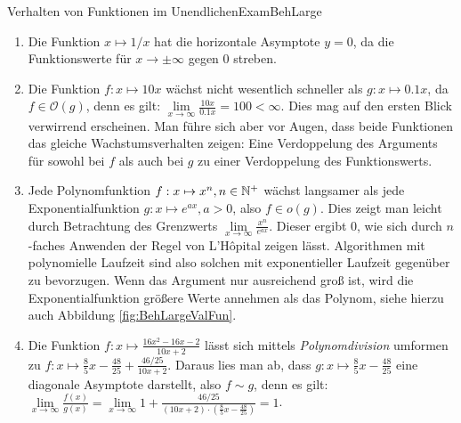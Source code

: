 \begin{example}{Verhalten von Funktionen im Unendlichen}{ExamBehLarge}
    \begin{enumerate}
        \item Die Funktion $x \mapsto 1/x$ hat die horizontale Asymptote $y=0$, da die Funktionswerte für $x \to \pm\infty$ gegen $0$ streben.
        \item Die Funktion $f: x \mapsto 10x$ wächst nicht wesentlich schneller als $g: x \mapsto 0.1x$, da $f \in \mathcal{O}(g)$, denn es gilt: $\lim\limits_{x\to\infty} \frac{10x}{0.1x} = 100 < \infty$. Dies mag auf den ersten Blick verwirrend erscheinen. Man führe sich aber vor Augen, dass beide Funktionen das gleiche Wachstumsverhalten zeigen: Eine Verdoppelung des Arguments für sowohl bei $f$ als auch bei $g$ zu einer Verdoppelung des Funktionswerts.
        \item Jede Polynomfunktion $f: x \mapsto x^n, n \in \mathbb{N}^+$ wächst langsamer als jede Exponentialfunktion $g: x \mapsto e^{ax}, a > 0$, also $f \in o(g)$. Dies zeigt man leicht durch Betrachtung des Grenzwerts $\lim\limits_{x\to\infty} \frac{x^n}{e^{ax}}$. Dieser ergibt $0$, wie sich durch $n$-faches Anwenden der Regel von L'Hôpital zeigen lässt. Algorithmen mit polynomielle Laufzeit sind also solchen mit exponentieller Laufzeit gegenüber zu bevorzugen. Wenn das Argument nur ausreichend groß ist, wird die Exponentialfunktion größere Werte annehmen als das Polynom, siehe hierzu auch Abbildung \ref{fig:BehLargeValFun}.
        \item Die Funktion $f: x \mapsto \frac{16x^2-16x-2}{10x+2}$ lässt sich mittels \emph{Polynomdivision} umformen zu $f: x \mapsto \frac{8}{5}x - \frac{48}{25} + \frac{46/25}{10x+2}$. Daraus lies man ab, dass $g: x \mapsto \frac{8}{5}x - \frac{48}{25}$ eine diagonale Asymptote darstellt, also $f \sim g$, denn es gilt: $\lim\limits_{x\to\infty} \frac{f(x)}{g(x)} = \lim\limits_{x\to\infty} 1 + \frac{46/25}{(10x+2)\cdot(\frac{8}{5}x - \frac{48}{25})} = 1$.
    \end{enumerate}
\end{example}

